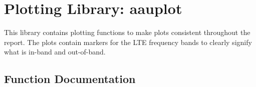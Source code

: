 \section{Plotting Library: aauplot}
\label{sec:aauplotlib}

This library contains plotting functions to make plots consistent throughout the report. The plots contain markers for the LTE frequency bands to clearly signify what is in-band and out-of-band.

\subsection{Function Documentation}


